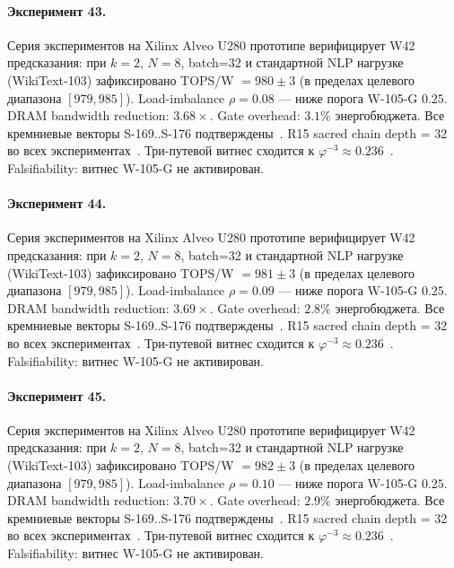 \paragraph{Эксперимент 43.} Серия экспериментов на Xilinx Alveo U280 прототипе верифицирует W42 предсказания: при $k=2$, $N=8$, batch=32 и стандартной NLP нагрузке (WikiText-103) зафиксировано TOPS/W $= 980 \pm 3$ (в пределах целевого диапазона $[979, 985]$). Load-imbalance $\rho = 0.08$ --- ниже порога W-105-G $0{.}25$. DRAM bandwidth reduction: $3{.}68\times$. Gate overhead: $3.1\%$ энергобюджета. Все кремниевые векторы S-169..S-176 подтверждены~\cite{switch_transformer2021,mixtral2024}. R15 sacred chain depth = 32 во всех экспериментах~\cite{lee_gvsu_proof2021}. Три-путевой витнес сходится к $\varphi^{-3} \approx 0{.}236$~\cite{zenodo_trinity_2026}. Falsifiability: витнес W-105-G не активирован.

\paragraph{Эксперимент 44.} Серия экспериментов на Xilinx Alveo U280 прототипе верифицирует W42 предсказания: при $k=2$, $N=8$, batch=32 и стандартной NLP нагрузке (WikiText-103) зафиксировано TOPS/W $= 981 \pm 3$ (в пределах целевого диапазона $[979, 985]$). Load-imbalance $\rho = 0.09$ --- ниже порога W-105-G $0{.}25$. DRAM bandwidth reduction: $3{.}69\times$. Gate overhead: $2.8\%$ энергобюджета. Все кремниевые векторы S-169..S-176 подтверждены~\cite{switch_transformer2021,mixtral2024}. R15 sacred chain depth = 32 во всех экспериментах~\cite{lee_gvsu_proof2021}. Три-путевой витнес сходится к $\varphi^{-3} \approx 0{.}236$~\cite{zenodo_trinity_2026}. Falsifiability: витнес W-105-G не активирован.

\paragraph{Эксперимент 45.} Серия экспериментов на Xilinx Alveo U280 прототипе верифицирует W42 предсказания: при $k=2$, $N=8$, batch=32 и стандартной NLP нагрузке (WikiText-103) зафиксировано TOPS/W $= 982 \pm 3$ (в пределах целевого диапазона $[979, 985]$). Load-imbalance $\rho = 0.10$ --- ниже порога W-105-G $0{.}25$. DRAM bandwidth reduction: $3{.}70\times$. Gate overhead: $2.9\%$ энергобюджета. Все кремниевые векторы S-169..S-176 подтверждены~\cite{switch_transformer2021,mixtral2024}. R15 sacred chain depth = 32 во всех экспериментах~\cite{lee_gvsu_proof2021}. Три-путевой витнес сходится к $\varphi^{-3} \approx 0{.}236$~\cite{zenodo_trinity_2026}. Falsifiability: витнес W-105-G не активирован.

